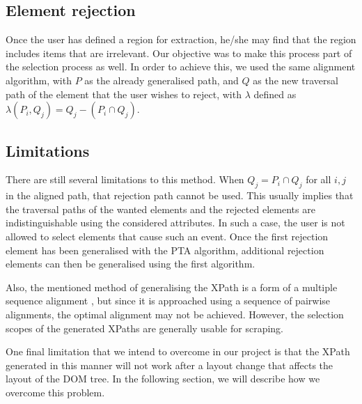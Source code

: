 \subsection{Element rejection}

Once the user has defined a region for extraction, he/she may find that the region includes
items that are irrelevant. Our objective was to make this process part of the selection process as
well. In order to achieve this, we used the same alignment algorithm, with $P$ as the already
generalised path, and $Q$ as the new traversal path of the element that the user wishes to
reject, with $\lambda$ defined as $\lambda(P_i,Q_j) = Q_j - (P_i \cap Q_j)$.


\subsection{Limitations}
There are still several limitations to this method. When $Q_j = P_i \cap Q_j$ for all $i,j$
in the aligned path, that rejection path cannot be used. This usually implies that the
traversal paths of the wanted elements and the rejected elements are indistinguishable using
the considered attributes. In such a case, the user is not allowed to select elements that
cause such an event. Once the first rejection element has been generalised with the PTA
algorithm, additional rejection elements can then be generalised using the first algorithm.

Also, the mentioned method of generalising the XPath is a form of a multiple sequence alignment
, but since it is approached using a sequence of pairwise alignments, the optimal alignment may
 not be achieved. However, the selection scopes of the generated XPaths are generally usable
for scraping.

One final limitation that we intend to overcome in our project is that the XPath generated
in this manner will not work after a layout change that affects the layout of the DOM
tree. In the following section, we will describe how we overcome this problem.